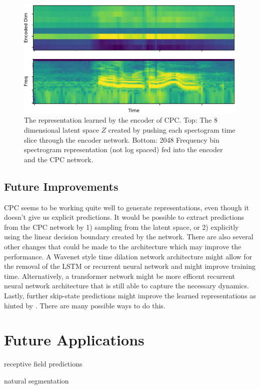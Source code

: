 \begin{figure}[tbp] 
  \centering
  \includegraphics[width=\textwidth]{figures/encoder.pdf}
  \caption[8 dimensional $Z$ space learned by Contrastive Predictive Coding.]
{The representation learned by the encoder of CPC. Top: The 8 dimensional latent space $Z$ created by pushing each spectogram time slice through the encoder network. Bottom: 2048 Frequency bin spectrogram representation (not log spaced) fed into the encoder and the CPC network.
}
  \label{fig:encoder}
\end{figure}

\subsection{Future Improvements}
CPC seems to be working quite well to generate representations, even though it doesn't give us explicit predictions. It would be possible to extract predictions from the CPC network by 1) sampling from the latent space, or 2) explicitly using the linear decision boundary created by the network. There are also several other changes that could be made to the architecture which may improve the performance. A Wavenet\cite{van2016wavenet} style time dilation network architecture might allow for the removal of the LSTM or recurrent neural network and might improve training time. Alternatively, a transformer network\cite{vaswani2017attention} might be more efficent recurrent neural network architecture that is still able to capture the necessary dynamics. Lastly, further skip-state predictions might improve the learned representations as hinted by \cite{gregor2018temporal}. There are many possible ways to do this.

\section{Future Applications}

receptive field predictions

natural segmentation